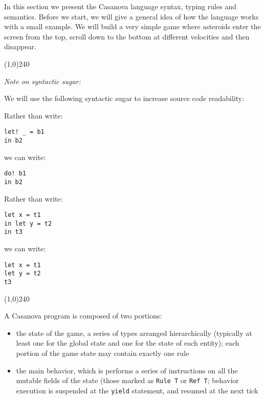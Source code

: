 
In this section we present the Casanova language syntax, typing rules and semantics. Before we start, we will give a general idea of how the language works with a small example. We will build a very simple game where asteroids enter the screen from the top, scroll down to the bottom at different velocities and then disappear.

\begin{center}
\line(1,0){240}
\end{center}

\textit{Note on syntactic sugar:}

We will use the following syntactic sugar to increase source code readability:

Rather than write:

\begin{lstlisting}
let! _ = b1
in b2
\end{lstlisting}

we can write:

\begin{lstlisting}
do! b1
in b2
\end{lstlisting}

Rather than write:

\begin{lstlisting}
let x = t1
in let y = t2
in t3
\end{lstlisting}

we can write:

\begin{lstlisting}
let x = t1
let y = t2
t3
\end{lstlisting}

\begin{comment}
We may also directly iterate all the elements of a table \texttt{t} by writing:

\begin{lstlisting}
for x in t do
  action
\end{lstlisting}

rather than explicitly using indices or \texttt{head} and \texttt{tail}.
\end{comment}

\begin{center}
\line(1,0){240}
\end{center}

A Casanova program is composed of two portions:
\begin{itemize}
\item the state of the game, a series of types arranged hierarchically (typically at least one for the global state and one for the state of each entity); each portion of the game state may contain exactly one rule
\item the main behavior, which is performs a series of instructions on all the mutable fields of the state (those marked as \texttt{Rule T} or \texttt{Ref T}; behavior execution is suspended at the \texttt{yield} statement, and resumed at the next tick
\end{itemize}

